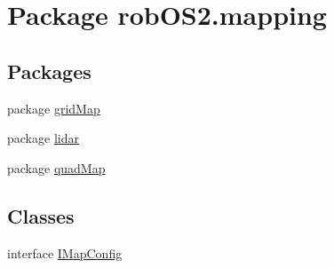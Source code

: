 \hypertarget{namespacerob_o_s2_1_1mapping}{
\section{Package robOS2.mapping}
\label{namespacerob_o_s2_1_1mapping}
}
\subsection*{Packages}
\begin{DoxyCompactItemize}
\item 
package \hyperlink{namespacerob_o_s2_1_1mapping_1_1grid_map}{gridMap}
\item 
package \hyperlink{namespacerob_o_s2_1_1mapping_1_1lidar}{lidar}
\item 
package \hyperlink{namespacerob_o_s2_1_1mapping_1_1quad_map}{quadMap}
\end{DoxyCompactItemize}
\subsection*{Classes}
\begin{DoxyCompactItemize}
\item 
interface \hyperlink{interfacerob_o_s2_1_1mapping_1_1_i_map_config}{IMapConfig}
\end{DoxyCompactItemize}
